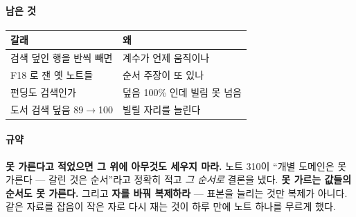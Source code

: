 \documentclass[10pt]{article}
\begin{document}
\paragraph{남은 것}
\begin{center}\small
\begin{tabular}{ll}
\hline
갈래 & 왜 \\
\hline
검색 덮인 행을 반씩 빼면 & 계수가 언제 움직이나 \\
F18 로 잰 옛 노트들 & 순서 주장이 또 있나 \\
펀딩도 검색인가 & 덮음 100\% 인데 빌림 못 넘음 \\
도서 검색 덮음 89$\to$100 & 빌릴 자리를 늘린다 \\
\hline
\end{tabular}
\end{center}

\paragraph{규약} \textbf{못 가른다고 적었으면 그 위에 아무것도 세우지 마라.}
노트 310이 ``개별 도메인은 못 가른다 --- 갈린 것은 순서''라고 정확히 적고
\emph{그 순서로} 결론을 냈다. \textbf{못 가르는 값들의 순서도 못 가른다.}
그리고 \textbf{자를 바꿔 복제하라} --- 표본을 늘리는 것만 복제가 아니다.
같은 자료를 잡음이 작은 자로 다시 재는 것이 하루 만에 노트 하나를 무르게
했다.
\end{document}

